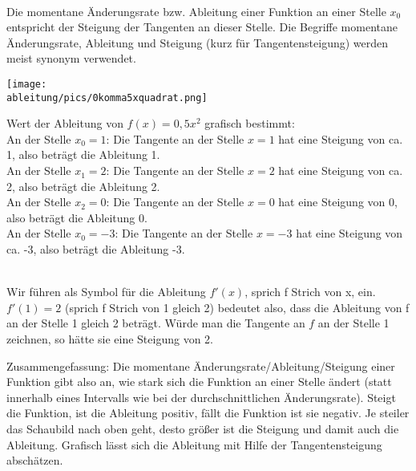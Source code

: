 \begin{tcolorbox}
	\phantom{ }\\
	\textcolor{loestc}{Die momentane Änderungsrate bzw. Ableitung einer Funktion an einer Stelle \(x_0\) entspricht der Steigung der Tangenten an dieser Stelle. Die Begriffe momentane Änderungsrate, Ableitung und Steigung (kurz für Tangentensteigung) werden meist synonym verwendet.}\\
\end{tcolorbox}
\begin{minipage}{\textwidth}
	\begin{minipage}{0.49\textwidth}
		\centering\texttt{[image: \\ableitung/pics/0komma5xquadrat.png]}
	\end{minipage}
	\begin{minipage}{0.49\textwidth}
		Wert der Ableitung von \(f(x)=0,5x^2\) grafisch bestimmt:\\
		An der Stelle \(x_0=1\): Die Tangente an der Stelle \(x=1\) hat eine Steigung von ca. 1, also beträgt die Ableitung 1.\\
		An der Stelle \(x_1=2\): \textcolor{loes}{Die Tangente an der Stelle \(x=2\) hat eine Steigung von ca. 2, also beträgt die Ableitung 2.}\\
		An der Stelle \(x_2=0\): \textcolor{loes}{Die Tangente an der Stelle \(x=0\) hat eine Steigung von 0, also beträgt die Ableitung 0.}\\
		An der Stelle \(x_0=-3\): \textcolor{loes}{Die Tangente an der Stelle \(x=-3\) hat eine Steigung von ca. -3, also beträgt die Ableitung -3.}\\
	\end{minipage}
\end{minipage}
\begin{tcolorbox}
	\phantom{ }\\
	\textcolor{loestc}{Wir führen als Symbol für die Ableitung \(f'(x)\), sprich f Strich von x, ein.\\
		\(f'(1)=2\) (sprich f Strich von 1 gleich 2) bedeutet also, dass die Ableitung von f an der Stelle 1 gleich 2 beträgt. Würde man die Tangente an \(f\) an der Stelle 1 zeichnen, so hätte sie eine Steigung von 2.}\\
\end{tcolorbox}
Zusammengefassung: Die momentane Änderungsrate/Ableitung/Steigung einer Funktion gibt also an, wie stark sich die Funktion an einer Stelle ändert (statt innerhalb eines Intervalls wie bei der durchschnittlichen Änderungsrate). Steigt die Funktion, ist die Ableitung positiv, fällt die Funktion ist sie negativ. Je steiler das Schaubild nach oben geht, desto größer ist die Steigung und damit auch die Ableitung. Grafisch lässt sich die Ableitung mit Hilfe der Tangentensteigung abschätzen.
